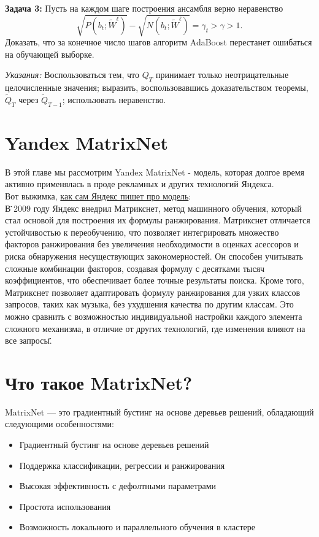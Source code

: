     \textbf{Задача 3:} Пусть на каждом шаге построения ансамбля верно неравенство 
    \begin{equation*}
    	\sqrt{P\left(b_t ; \widetilde{W}^{\ell}\right)}-\sqrt{N\left(b_t ; \widetilde{W}^{\ell}\right)}=\gamma_t>\gamma>1.
    \end{equation*}
    Доказать, что за конечное число шагов алгоритм AdaBoost перестанет ошибаться на обучающей выборке.
    
    \textit{Указания:} Воспользоваться тем, что $Q_T$ принимает только неотрицательные целочисленные значения; выразить, воспользовавшись доказательством теоремы, $\widetilde{Q}_{T}$ через $\widetilde{Q}_{T-1}$; использовать неравенство.
    
\section{Yandex MatrixNet}
В этой главе мы рассмотрим Yandex MatrixNet - модель, которая долгое время активно применялась в проде рекламных и других технологий Яндекса. \\
Вот выжимка, \href{https://yandex.ru/company/technologies/matrixnet/}{как сам Яндекс пишет про модель}:\\
\"В 2009 году Яндекс внедрил Матрикснет, метод машинного обучения, который стал основой для построения их формулы ранжирования. Матрикснет отличается устойчивостью к переобучению, что позволяет интегрировать множество факторов ранжирования без увеличения необходимости в оценках асессоров и риска обнаружения несуществующих закономерностей. Он способен учитывать сложные комбинации факторов, создавая формулу с десятками тысяч коэффициентов, что обеспечивает более точные результаты поиска. Кроме того, Матрикснет позволяет адаптировать формулу ранжирования для узких классов запросов, таких как музыка, без ухудшения качества по другим классам. Это можно сравнить с возможностью индивидуальной настройки каждого элемента сложного механизма, в отличие от других технологий, где изменения влияют на все запросы\".

\section{Что такое MatrixNet?}
MatrixNet — это градиентный бустинг на основе деревьев решений, обладающий следующими особенностями:
\begin{itemize}
    \item Градиентный бустинг на основе деревьев решений
    \item Поддержка классификации, регрессии и ранжирования
    \item Высокая эффективность с дефолтными параметрами
    \item Простота использования
    \item Возможность локального и параллельного обучения в кластере
\end{itemize}

